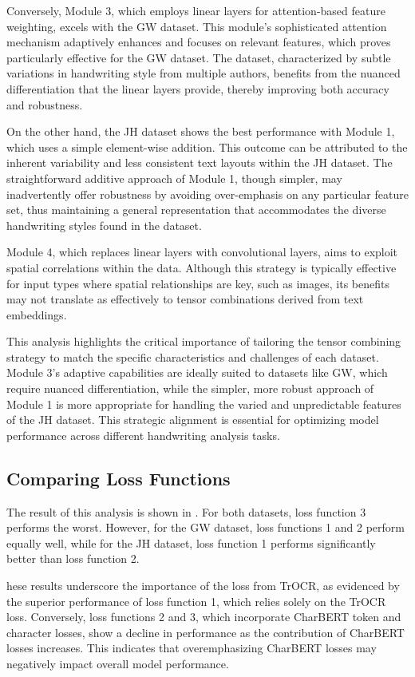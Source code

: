 Conversely, Module 3, which employs linear layers for attention-based feature weighting, excels with the GW dataset. This module's sophisticated attention mechanism adaptively enhances and focuses on relevant features, which proves particularly effective for the GW dataset. The dataset, characterized by subtle variations in handwriting style from multiple authors, benefits from the nuanced differentiation that the linear layers provide, thereby improving both accuracy and robustness.

On the other hand, the JH dataset shows the best performance with Module 1, which uses a simple element-wise addition. This outcome can be attributed to the inherent variability and less consistent text layouts within the JH dataset. The straightforward additive approach of Module 1, though simpler, may inadvertently offer robustness by avoiding over-emphasis on any particular feature set, thus maintaining a general representation that accommodates the diverse handwriting styles found in the dataset.

Module 4, which replaces linear layers with convolutional layers, aims to exploit spatial correlations within the data. Although this strategy is typically effective for input types where spatial relationships are key, such as images, its benefits may not translate as effectively to tensor combinations derived from text embeddings.

This analysis highlights the critical importance of tailoring the tensor combining strategy to match the specific characteristics and challenges of each dataset. Module 3's adaptive capabilities are ideally suited to datasets like GW, which require nuanced differentiation, while the simpler, more robust approach of Module 1 is more appropriate for handling the varied and unpredictable features of the JH dataset. This strategic alignment is essential for optimizing model performance across different handwriting analysis tasks.

\subsection{Comparing Loss Functions}
\label{subsec:5_comparing_loss_functions}
The result of this analysis is shown in . For both datasets, loss function 3 performs the worst. However, for the GW dataset, loss functions 1 and 2 perform equally well, while for the JH dataset, loss function 1 performs significantly better than loss function 2.

hese results underscore the importance of the loss from TrOCR, as evidenced by the superior performance of loss function 1, which relies solely on the TrOCR loss. Conversely, loss functions 2 and 3, which incorporate CharBERT token and character losses, show a decline in performance as the contribution of CharBERT losses increases. This indicates that overemphasizing CharBERT losses may negatively impact overall model performance.

